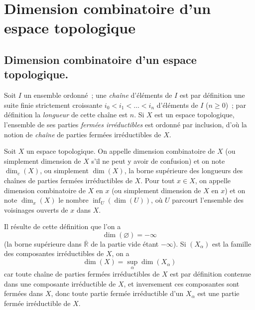 
\setcounter{section}{13}
\section{Dimension combinatoire d'un espace topologique}
\label{section:0.14-fr}

\setcounter{subsection}{0}
\subsection{Dimension combinatoire d'un espace topologique.}
\label{subsection:0.14.1-fr}

\begin{env}[14.1.1]
\label{0.14.1.1-fr}
Soit $I$ un ensemble ordonné~; une \emph{chaîne} d'éléments de $I$ est par
définition une suite finie strictement croissante
$i_0<i_1<\ldots<i_n$ d'éléments de $I$ ($n\geq 0$)~; par définition la
\emph{longueur} de cette chaîne est $n$. Si $X$ est un espace topologique,
l'ensemble de ses parties \emph{fermées irréductibles} est ordonné par
inclusion, d'où la notion de \emph{chaîne} de parties fermées irréductibles de
$X$.
\end{env}

\begin{definition}[14.1.2]
\label{0.14.1.2-fr}
Soit $X$ un espace topologique. On appelle dimension combinatoire de
$X$ \textup{(ou simplement} dimension de $X$ \textup{s'il ne peut y avoir de
confusion)} et on note $\dim_c(X)$, ou simplement $\dim(X)$, la borne
supérieure des longueurs des chaînes de parties fermées irréductibles de $X$.
Pour tout $x\in X$, on appelle dimension combinatoire de $X$ en $x$
\textup{(ou simplement} dimension de $X$ en $x$) et on note $\dim_x(X)$ le
nombre $\inf_U(\dim(U))$, où $U$ parcourt l'ensemble des voisinages ouverts de
$x$ dans $X$.
\end{definition}

Il résulte de cette définition que l'on a
\[
  \dim(\varnothing)=-\infty
\]
(la borne supérieure dans $\overline{\mathbb R}$ de la partie vide étant
$-\infty$). Si $(X_\alpha)$ est la famille des composantes irréductibles de
$X$, on a
\[
  \dim(X)=\sup_\alpha\dim(X_\alpha)
  \tag{14.1.2.1}\label{0.14.1.2.1-fr}
\]
car toute chaîne de parties fermées irréductibles de $X$ est par définition
contenue dans une composante irréductible de $X$, et inversement ces
composantes sont fermées dans $X$, donc toute partie fermée irréductible d'un
$X_\alpha$ est une partie fermée irréductible de $X$.

